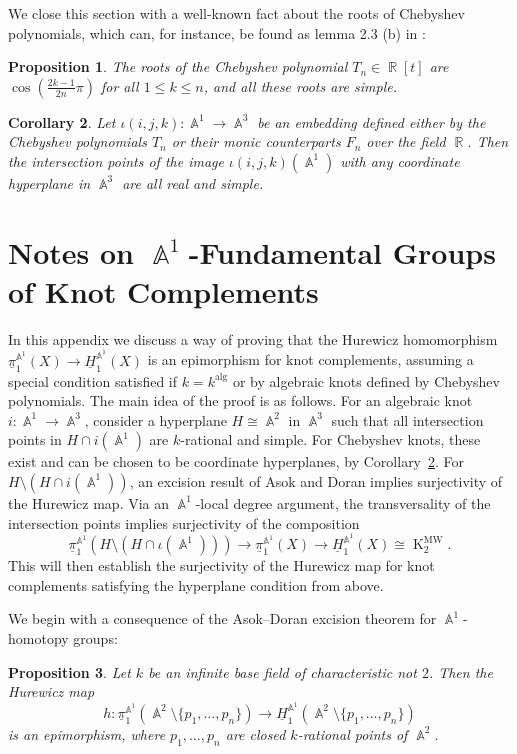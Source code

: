 \documentclass[english]{amsart}
\newtheorem{prop}{Proposition}[section]
\newtheorem{cor}[prop]{Corollary}
\theoremstyle{definition}
\DeclareMathOperator{\R}{\mathbb{R}}
\DeclareMathOperator{\A}{\mathbb{A}}
\DeclareMathOperator{\alg}{alg}
\DeclareMathOperator{\K}{K}
\DeclareMathOperator{\MW}{MW}
\begin{document}
We close this section with a well-known fact about the roots of Chebyshev polynomials, which can, for instance, be found as lemma 2.3 (b) in \cite{freudenburg:freudenburg}:
\begin{prop}
    The roots of the Chebyshev polynomial $T_n \in \R[t]$ are $\cos\left(\frac{2k-1}{2n}\pi\right)$ for all $1 \leq k \leq n$, and all these roots are simple. 
\end{prop}

\begin{cor}
\label{cor:chebyshev-simple}
    Let $\iota(i,j,k)\colon\A^1\to\A^3$ be an embedding defined either by the Chebyshev polynomials $T_n$ or their monic counterparts $F_n$ over the field $\R$. Then the intersection points of the image $\iota(i,j,k)(\A^1)$ with any coordinate hyperplane in $\A^3$ are all real and simple.
\end{cor}

\section{Notes on \texorpdfstring{$\A^1$}{A1}-Fundamental Groups of Knot Complements}\label{Appendix B}

In this appendix we discuss a way of proving that the Hurewicz homomorphism $\underline{\pi}_1^{\A^1}\!(X)\to \underline{H}_1^{\A^1}\!(X)$ is an epimorphism for knot complements, assuming a special condition satisfied if $k = k^{\alg}$ or by algebraic knots defined by Chebyshev polynomials. The main idea of the proof is as follows. For an algebraic knot $i \colon \A^1 \to \A^3$, consider a hyperplane $H\cong\A^2$ in $\A^3$ such that all intersection points in $H \cap i(\A^1)$ are $k$-rational and simple. For Chebyshev knots, these exist and can be chosen to be coordinate hyperplanes, by Corollary~\ref{cor:chebyshev-simple}. For $H \setminus (H \cap i(\A^1))$, an excision result of Asok and Doran implies surjectivity of the Hurewicz map. Via an $\A^1$-local degree argument, the transversality of the intersection points implies surjectivity of the composition
\[
\underline{\pi}_1^{\A^1}\!(H\setminus(H\cap\iota(\A^1)))\to\underline{\pi}_1^{\A^1}\!(X)\to \underline{H}_1^{\A^1}\!(X)\cong\K^{\MW}_2.
\]
This will then establish the surjectivity of the Hurewicz map for knot complements satisfying the hyperplane condition from above.

We begin with a consequence of the Asok--Doran excision theorem for $\A^1$-homotopy groups:

\begin{prop}\label{prop:hurewicz-plane-minus-pts}
   Let $k$ be an infinite base field of characteristic not $2$. Then the Hurewicz map 
   $$h \colon \underline{\pi}_1^{\A^1}\!(\A^2 \setminus \{ p_1,\dots,p_n \})\to \underline{H}_1^{\A^1}\!(\A^2 \setminus \{ p_1,\dots,p_n \})$$
   is an epimorphism, where  $p_1,\dotsc,p_n$ are closed $k$-rational points of $\A^2$.
\end{prop}
\end{document}
